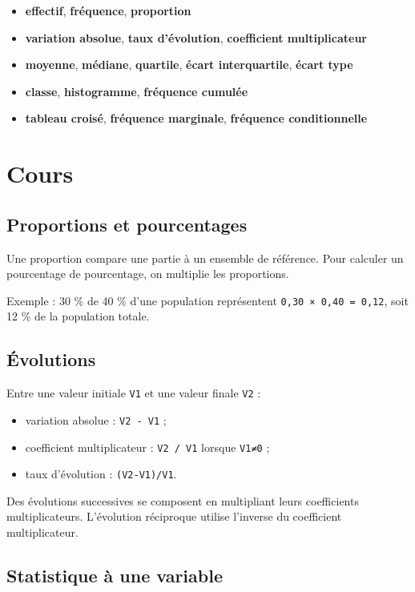 \begin{itemize}
\item \textbf{effectif}, \textbf{fréquence}, \textbf{proportion}
\item \textbf{variation absolue}, \textbf{taux d'évolution}, \textbf{coefficient multiplicateur}
\item \textbf{moyenne}, \textbf{médiane}, \textbf{quartile}, \textbf{écart interquartile}, \textbf{écart type}
\item \textbf{classe}, \textbf{histogramme}, \textbf{fréquence cumulée}
\item \textbf{tableau croisé}, \textbf{fréquence marginale}, \textbf{fréquence conditionnelle}
\end{itemize}

\section{Cours}

\subsection{Proportions et pourcentages}

Une proportion compare une partie à un ensemble de référence. Pour calculer un pourcentage de pourcentage, on multiplie les proportions.

Exemple : 30 \% de 40 \% d'une population représentent \texttt{0,30 × 0,40 = 0,12}, soit 12 \% de la population totale.

\subsection{Évolutions}

Entre une valeur initiale \texttt{V1} et une valeur finale \texttt{V2} :

\begin{itemize}
\item variation absolue : \texttt{V2 - V1} ;
\item coefficient multiplicateur : \texttt{V2 / V1} lorsque \texttt{V1≠0} ;
\item taux d'évolution : \texttt{(V2-V1)/V1}.
\end{itemize}

Des évolutions successives se composent en multipliant leurs coefficients multiplicateurs. L'évolution réciproque utilise l'inverse du coefficient multiplicateur.

\subsection{Statistique à une variable}

